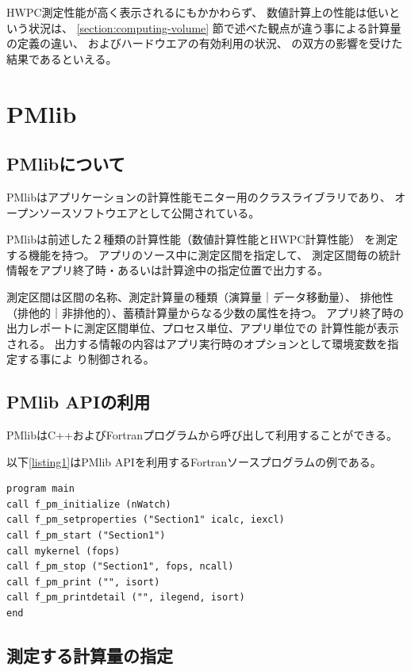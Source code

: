 \documentclass[submit,techrep,noauthor]{ipsj}
\begin{document}
HWPC測定性能が高く表示されるにもかかわらず、
数値計算上の性能は低いという状況は、
\ref{section:computing-volume}
節で述べた観点が違う事による計算量の定義の違い、
およびハードウエアの有効利用の状況、
の双方の影響を受けた結果であるといえる。


\section{PMlib}

\subsection {PMlibについて}

PMlibはアプリケーションの計算性能モニター用のクラスライブラリであり、
オープンソースソフトウエアとして公開されている。
\cite{PMlib2:webpage} \par
PMlibは前述した２種類の計算性能（数値計算性能とHWPC計算性能）
を測定する機能を持つ。
アプリのソース中に測定区間を指定して、
測定区間毎の統計情報をアプリ終了時・あるいは計算途中の指定位置で出力する。

測定区間は区間の名称、測定計算量の種類（演算量｜データ移動量）、
排他性（排他的｜非排他的）、蓄積計算量からなる少数の属性を持つ。
アプリ終了時の出力レポートに測定区間単位、プロセス単位、アプリ単位での
計算性能が表示される。
出力する情報の内容はアプリ実行時のオプションとして環境変数を指定する事によ
り制御される。


\subsection {PMlib APIの利用}
PMlibはC++およびFortranプログラムから呼び出して利用することができる。

以下\ref{listing1}はPMlib APIを利用するFortranソースプログラムの例である。
\begin{lstlisting}[caption={\hfill},label={listing1},captionpos=t]
program main
call f_pm_initialize (nWatch)
call f_pm_setproperties ("Section1" icalc, iexcl)
call f_pm_start ("Section1")
call mykernel (fops)
call f_pm_stop ("Section1", fops, ncall)
call f_pm_print ("", isort)
call f_pm_printdetail ("", ilegend, isort)
end
\end{lstlisting}


\subsection {測定する計算量の指定}
\end{document}

